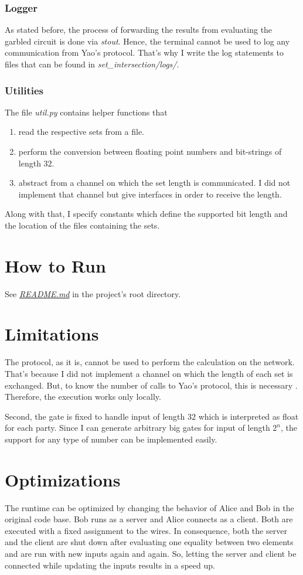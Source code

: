 \documentclass[a4paper,12pt]{scrartcl}
\begin{document}
\subsubsection{Logger}

As stated before, the process of forwarding the results from evaluating the garbled circuit is done via \textit{stout}. Hence, the terminal cannot be used to log any communication from Yao's protocol. That's why I write the log statements to files that can be found in \textit{set\_intersection/logs/}.

\subsubsection{Utilities}

The file \textit{util.py} contains helper functions that 
\begin{enumerate}
 \item read the respective sets from a file.
 \item perform the conversion between floating point numbers and bit-strings of length $32$. 
 \item abstract from a channel on which the set length is communicated. I did not implement that channel but give interfaces in order to receive the length.
\end{enumerate}

Along with that, I specify constants which define the supported bit length and the location of the files containing the sets.


\section{How to Run}
See \href{../README.md}{\textit{README.md}} in the project's root directory. 


\section{Limitations}
The protocol, as it is, cannot be used to perform the calculation on the network. That's because I did not implement a channel on which the length of each set is exchanged. But, to know the number of calls to Yao's protocol, this is necessary . Therefore, the execution works only locally.  

Second, the gate is fixed to handle input of length $32$ which is interpreted as float for each party. Since I can generate arbitrary big gates for input of length $2^n$, the support for any type of number can be implemented easily. 

\section{Optimizations}
The runtime can be optimized by changing the behavior of Alice and Bob in the original code base. Bob runs as a server and Alice connects as a client. Both are executed with a fixed assignment to the wires. In consequence, both the server and the client are shut down after evaluating one equality between two elements and are run with new inputs again and again. So, letting the server and client be connected while updating the inputs results in a speed up.
\end{document}
